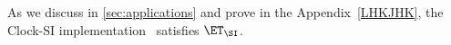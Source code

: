 

As we discuss in \cref{sec:applications} and prove in the Appendix~\ref{LHKJHK},  the Clock-SI
implementation~\cite{Du:2013:CSI:2553409.2553434} satisfies
$\ET_{\SI}$. 

%
%
